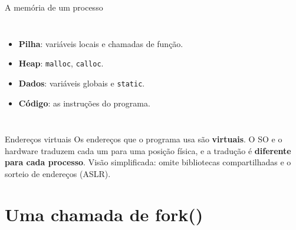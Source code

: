 \documentclass[aspectratio=169]{beamer}
\begin{document}
\begin{frame}{A memória de um processo}
\begin{columns}[c]

\small
\begin{itemize}
    \item \textbf{Pilha}: variáveis locais e chamadas de função.
    \item \textbf{Heap}: \texttt{malloc}, \texttt{calloc}.
    \item \textbf{Dados}: variáveis globais e \texttt{static}.
    \item \textbf{Código}: as instruções do programa.
\end{itemize}
\end{columns}

\vspace{0.5em}
\begin{alertblock}{Endereços virtuais}
Os endereços que o programa usa são \textbf{virtuais}. O SO e o hardware traduzem cada um para uma posição física, e a tradução é \textbf{diferente para cada processo}. Visão simplificada: omite bibliotecas compartilhadas e o sorteio de endereços (ASLR).
\end{alertblock}
\end{frame}

\section{Uma chamada de fork()}
\end{document}
